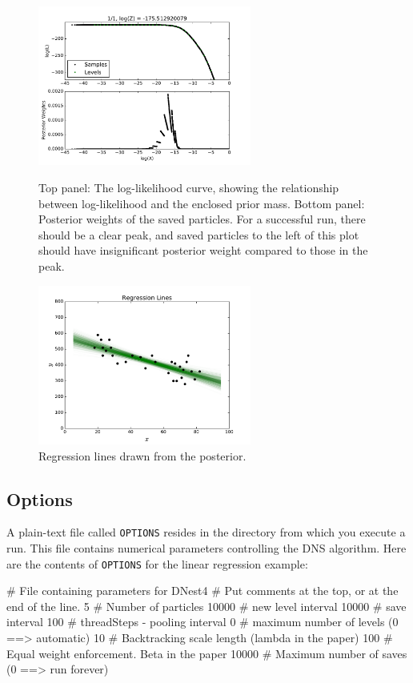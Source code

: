 \documentclass[article, nojss]{jss}
\begin{document}
\begin{figure}[ht!]
\begin{minipage}{7.5cm}
\includegraphics[width=7cm]{figures/fig3.pdf}
\caption{Top panel: The log-likelihood curve, showing the relationship
between log-likelihood and the enclosed prior mass.
Bottom panel: Posterior weights of the saved particles.
For a successful run, there should be a clear peak, and saved particles
to the left of this plot should have insignificant posterior weight compared
to those in the peak.
\label{fig:fig3}}
\end{minipage}\hspace{0.5cm}
\begin{minipage}{7.5cm}
\includegraphics[width=7cm]{figures/regression_lines.pdf}
\caption{Regression lines drawn from the posterior.
\label{fig:regression_lines}}
\end{minipage}
\end{figure}

\subsection{Options}\label{sec:options}
A plain-text file called {\tt OPTIONS} resides in the directory from which you
execute a run. This file contains numerical parameters controlling the
DNS algorithm. Here are the contents of {\tt OPTIONS} for the linear
regression example:

\begin{CodeChunk}
\begin{CodeInput}
# File containing parameters for DNest4
# Put comments at the top, or at the end of the line.
5       # Number of particles
10000   # new level interval
10000   # save interval
100     # threadSteps - pooling interval
0       # maximum number of levels (0 ==> automatic)
10      # Backtracking scale length (lambda in the paper)
100     # Equal weight enforcement. Beta in the paper
10000   # Maximum number of saves (0 ==> run forever)
\end{CodeInput}
\end{CodeChunk}
\end{document}
